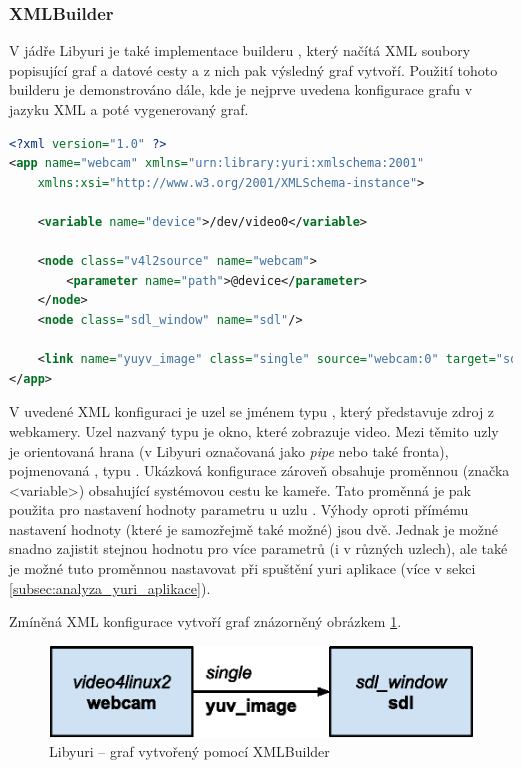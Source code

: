 \documentclass[thesis=M,czech]{FITthesis}[2012/06/26]
\begin{document}
\subsubsection{XMLBuilder} \label{subsec:analyza_yuri_vytvoreni_xml}
V jádře Libyuri je také implementace builderu , který načítá XML soubory popisující graf a datové cesty a z nich pak výsledný graf vytvoří. Použití tohoto builderu je demonstrováno dále, kde je nejprve uvedena konfigurace grafu v jazyku XML a poté vygenerovaný graf.
\\
\begin{minipage}{\linewidth}
\begin{lstlisting}[language=XML]
<?xml version="1.0" ?>
<app name="webcam" xmlns="urn:library:yuri:xmlschema:2001"
    xmlns:xsi="http://www.w3.org/2001/XMLSchema-instance">

    <variable name="device">/dev/video0</variable>    

    <node class="v4l2source" name="webcam">
        <parameter name="path">@device</parameter>
    </node>
    <node class="sdl_window" name="sdl"/>

    <link name="yuyv_image" class="single" source="webcam:0" target="sdl:0"/>
</app>
\end{lstlisting}
\end{minipage}
V uvedené XML konfiguraci je uzel se jménem  typu , který představuje zdroj z webkamery. Uzel nazvaný  typu  je okno, které zobrazuje video. Mezi těmito uzly je orientovaná hrana (v Libyuri označovaná jako \textit{pipe} nebo také fronta), pojmenovaná , typu . Ukázková konfigurace zároveň obsahuje proměnnou (značka <variable>) obsahující systémovou cestu ke kameře. Tato proměnná je pak použita pro nastavení hodnoty parametru  u uzlu . Výhody oproti přímému nastavení hodnoty (které je samozřejmě také možné) jsou dvě. Jednak je možné snadno zajistit stejnou hodnotu pro více parametrů (i v různých uzlech), ale také je možné tuto proměnnou nastavovat při spuštění yuri aplikace (více v sekci \ref{subsec:analyza_yuri_aplikace}). 

Zmíněná XML konfigurace vytvoří graf znázorněný obrázkem \ref{img:yuri_vytvoreni_xml}.
\\
\begin{figure}[h]\centering
	\includegraphics[width=1\textwidth]{images/yuri_xml_graph.eps}
	\caption{Libyuri -- graf vytvořený pomocí XMLBuilder}\label{img:yuri_vytvoreni_xml}
\end{figure}
\end{document}
